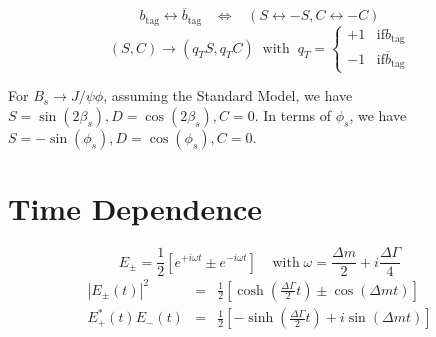 \documentclass[a4paper,9pt,twoside]{article}
\begin{document}
\begin{equation}
b_\mathrm{tag} \leftrightarrow \overline{b}_\mathrm{tag} \;\;\;\Leftrightarrow\;\;\;  ( S \leftrightarrow -S, C\leftrightarrow -C ) 
\end{equation}
\begin{equation}
(S,C) \rightarrow (q_T S, q_T C) \;\; \mathrm{with}\;\; q_T = \left\{\begin{array}{l} +1 \;\;\; \mathrm{if} b_\mathrm{tag} \\
                                                                                   -1 \;\;\; \mathrm{if} \overline{b}_\mathrm{tag}
\end{array} \right.
\end{equation}

For $B_s\rightarrow J/\psi\phi$, assuming the Standard Model,  we have $S=\sin(2\beta_s),D=\cos(2\beta_s),C=0$.
In terms of $\phi_s$, we have $S=-\sin(\phi_s),D=\cos(\phi_s),C=0$.


\section{Time Dependence}

\begin{equation}
  E_\pm = \frac{1}{2} \left[ e^{+i\omega t } \pm e^{-i\omega t } \right]\;\;\;\;\mathrm{with}\;
   \omega = \frac{\Delta m}{2} + i\frac{\Delta \Gamma}{4} 
\end{equation}
\begin{eqnarray}
 | E_\pm(t) |^2  &=& \frac{1}{2}\left[ \cosh\left(\frac{\Delta\Gamma}{2}t\right) \pm \cos\left(\Delta m t \right) \right] \\
 E_+^*(t)E_-(t)  &=& \frac{1}{2}\left[ -\sinh\left(\frac{\Delta\Gamma}{2}t\right) + i \sin\left(\Delta m t \right) \right]
\end{eqnarray}
\end{document}
